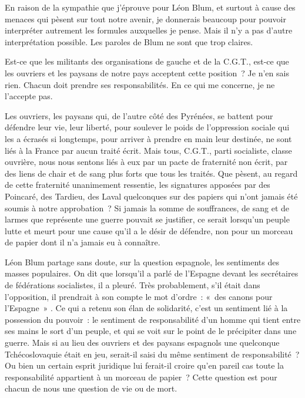 \documentclass[french,twoside]{book} %
\begin{document}
En raison de la sympathie que j'éprouve pour Léon Blum, et surtout à cause des menaces qui pèsent sur tout notre avenir, je donnerais beaucoup pour pouvoir interpréter autrement les formules auxquelles je pense. Mais il n'y a pas d'autre interprétation possible. Les paroles de Blum ne sont que trop claires.\par
Est-ce que les militants des organisations de gauche et de la C.G.T., est-ce que les ouvriers et les paysans de notre pays acceptent cette position ? Je n'en sais rien. Chacun doit prendre ses responsabilités. En ce qui me concerne, je ne l'accepte pas.\par
Les ouvriers, les paysans qui, de l'autre côté des Pyrénées, se battent pour défendre leur vie, leur liberté, pour soulever le poids de l'oppression sociale qui les a écrasés si longtemps, pour arriver à prendre en main leur destinée, ne sont liés à la France par aucun traité écrit. Mais tous, C.G.T., parti socialiste, classe ouvrière, nous nous sentons liés à eux par un pacte de fraternité non écrit, par des liens de chair et de sang plus forts que tous les traités. Que pèsent, au regard de cette fraternité unanimement ressentie, les signatures apposées par des Poincaré, des Tardieu, des Laval quelconques sur des papiers qui n'ont jamais été soumis à notre approbation ? Si jamais la somme de souffrances, de sang et de larmes que représente une guerre pouvait se justi­fier, ce serait lorsqu'un peuple lutte et meurt pour une cause qu'il a le désir de défendre, non pour un morceau de papier dont il n'a jamais eu à connaître.\par
Léon Blum partage sans doute, sur la question espagnole, les sentiments des masses populaires. On dit que lorsqu'il a parlé de l'Espagne devant les secrétaires de fédérations socialistes, il a pleuré. Très probablement, s'il était dans l'opposition, il prendrait à son compte le mot d'ordre : « des canons pour l'Espagne » . Ce qui a retenu son élan de solidarité, c'est un sentiment lié à la possession du pouvoir : le sentiment de responsabilité d'un homme qui tient entre ses mains le sort d'un peuple, et qui se voit sur le point de le précipiter dans une guerre. Mais si au lieu des ouvriers et des paysans espagnols une quelconque Tchécoslovaquie était en jeu, serait-il saisi du même sentiment de responsabilité ? Ou bien un certain esprit juridique lui ferait-il croire qu’en pareil cas toute la responsabilité appartient à un morceau de papier ? Cette question est pour chacun de nous une question de vie ou de mort.\par
\end{document}
